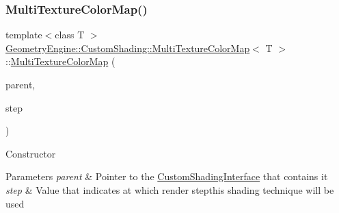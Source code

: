 \subsubsection{\texorpdfstring{MultiTextureColorMap()}{MultiTextureColorMap()}\hspace{0.1cm}{\footnotesize\ttfamily [1/2]}}
{\footnotesize\ttfamily template$<$class T $>$ \\
\mbox{\hyperlink{class_geometry_engine_1_1_custom_shading_1_1_multi_texture_color_map}{Geometry\+Engine\+::\+Custom\+Shading\+::\+Multi\+Texture\+Color\+Map}}$<$ T $>$\+::\mbox{\hyperlink{class_geometry_engine_1_1_custom_shading_1_1_multi_texture_color_map}{Multi\+Texture\+Color\+Map}} (\begin{DoxyParamCaption}\item[{\mbox{\hyperlink{class_geometry_engine_1_1_custom_shading_1_1_custom_shading_interface}{Custom\+Shading\+Interface}} $\ast$}]{parent,  }\item[{\mbox{\hyperlink{namespace_geometry_engine_1_1_custom_shading_a2dc236a5b567da5099069ce2b2be5609}{Custom\+Shading\+Steps}}}]{step }\end{DoxyParamCaption})\hspace{0.3cm}{\ttfamily [inline]}}

Constructor 
\begin{DoxyParams}{Parameters}
{\em parent} & Pointer to the \mbox{\hyperlink{class_geometry_engine_1_1_custom_shading_1_1_custom_shading_interface}{Custom\+Shading\+Interface}} that contains it \\
\hline
{\em step} & Value that indicates at which render stepthis shading technique will be used \\
\hline
\end{DoxyParams}
\mbox{\label{class_geometry_engine_1_1_custom_shading_1_1_multi_texture_color_map_a76266fac65587fdc190620ae7c17e32b}} 
